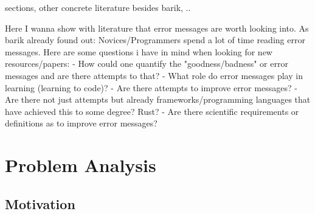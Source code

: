 \documentclass[
	bibliography=totoc,
	listof=totoc,
]{scrbook}
\begin{document}
\begin{marker}\begin{justify}
sections, other concrete literature besides barik, ..

Here I wanna show with literature that error messages are worth looking into. As barik already found out: Novices/Programmers spend a lot of time reading error messages.
Here are some questions i have in mind when looking for new resources/papers:
- How could one quantify the "goodness/badness" or error messages and are there attempts to that?
- What role do error messages play in learning (learning to code)?
- Are there attempts to improve error messages?
- Are there not just attempts but already frameworks/programming languages that have achieved this to some degree? Rust?
- Are there scientific requirements or definitions as to improve error messages?
\end{justify}\end{marker}


\pagebreak %
\chapter{Problem Analysis} %
\section*{Motivation} %
\end{document}
